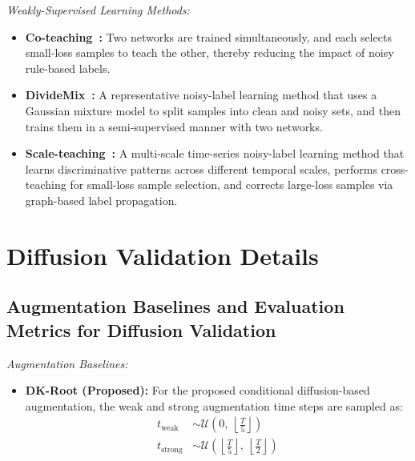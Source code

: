 \documentclass[lettersize,journal]{IEEEtran}
\begin{document}
{{{\color{R3color}
\noindent\textit{Weakly-Supervised Learning Methods:}
\begin{itemize}
    \item \textbf{Co-teaching~\cite{han2018coteaching}:} Two networks are trained simultaneously, and each selects small-loss samples to teach the other, thereby reducing the impact of noisy rule-based labels.
    \item \textbf{DivideMix~\cite{li2020dividemix}:} A representative noisy-label learning method that uses a Gaussian mixture model to split samples into clean and noisy sets, and then trains them in a semi-supervised manner with two networks.
    \item \textbf{Scale-teaching~\cite{liu2023scale}:} A multi-scale time-series noisy-label learning method that learns discriminative patterns across different temporal scales, performs cross-teaching for small-loss sample selection, and corrects large-loss samples via graph-based label propagation.
\end{itemize}
}



\section{Diffusion Validation Details}

\subsection{Augmentation Baselines and Evaluation Metrics for Diffusion Validation}
\label{appendix:diffusion_baselines}


\noindent\textit{Augmentation Baselines:}
\begin{itemize}
    \item \textbf{DK-Root (Proposed):} For the proposed conditional diffusion-based augmentation, the weak and strong augmentation time steps are sampled as:
    \begin{align}
        t_{\text{weak}} &\sim \mathcal{U}\left(0,\ \left\lfloor \frac{T}{5} \right\rfloor \right) \\
        t_{\text{strong}} &\sim \mathcal{U}\left(\left\lfloor \frac{T}{5} \right\rfloor,\ \left\lfloor \frac{T}{2} \right\rfloor \right)
    \end{align}


\end{itemize}}}
\end{document}
